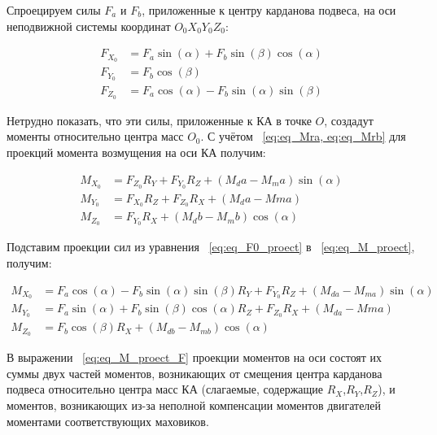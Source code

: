 Спроецируем силы $F_a$ и $F_b$, приложенные к центру карданова подвеса, на оси неподвижной системы координат $O_0X_0Y_0Z_0$:
\begin{samepage}
	\begin{equation}
		\label{eq:eq_F0_proect}
		\begin{aligned}
			F_{X_0} &= F_a\sin(\alpha)+F_b\sin(\beta)\cos(\alpha) \\
			F_{Y_0} &=F_b\cos(\beta) \\
			F_{Z_0} &= F_a\cos(\alpha)-F_b\sin(\alpha)\sin(\beta)
		\end{aligned}	
	\end{equation}
\end{samepage}

Нетрудно показать, что эти силы, приложенные к КА в точке $O$, создадут моменты относительно центра масс $O_0$. С учётом ~\cref{eq:eq_Mra, eq:eq_Mrb} для проекций момента возмущения на оси КА получим:
\begin{samepage}
	\begin{equation}
		\label{eq:eq_M_proect}
		\begin{aligned}
			M_{X_0} &= F_{Z_0}R_Y+F_{Y_0}R_Z+(M_da-M_ma)\sin(\alpha) \\
			M_{Y_0} &= F_{X_0}R_Z+F_{Z_0}R_X+(M_da-Mma)\\
			M_{Z_0} &= F_{Y_0}R_X+(M_db-M_mb)\cos(\alpha)
		\end{aligned}	
	\end{equation}
\end{samepage}

Подставим проекции сил из уравнения ~\cref{eq:eq_F0_proect} в ~\cref{eq:eq_M_proect}, получим:
\begin{samepage}
	\begin{equation}
		\label{eq:eq_M_proect_F}
		\begin{aligned}
			M_{X_0} &= F_a\cos(\alpha)-F_b\sin(\alpha)\sin(\beta)R_Y+F_{Y_0}R_Z+(M_{da}-M_{ma})\sin(\alpha) \\
			M_{Y_0} &= F_a\sin(\alpha)+F_b\sin(\beta)\cos(\alpha)R_Z+F_{Z_0}R_X+(M_{da}-M{ma})\\
			M_{Z_0} &= F_b\cos(\beta)R_X+(M_{db}-M_{mb})\cos(\alpha)
		\end{aligned}	
	\end{equation}
\end{samepage}

В выражении ~\cref{eq:eq_M_proect_F} проекции моментов на оси состоят их суммы двух частей моментов, возникающих от смещения центра карданова подвеса относительно центра масс КА (слагаемые, содержащие $R_X$,$R_Y$,$R_Z$), и моментов, возникающих из-за неполной компенсации моментов двигателей моментами соответствующих маховиков. 



